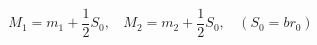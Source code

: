 \begin{equation}                              
M_{1} = m_{1} + \frac{1}{2} S_{0}, ~~~~                              
M_{2} = m_{2} + \frac{1}{2} S_{0}, ~~~~(S_{0} = b r_{0})
\end{equation} 
